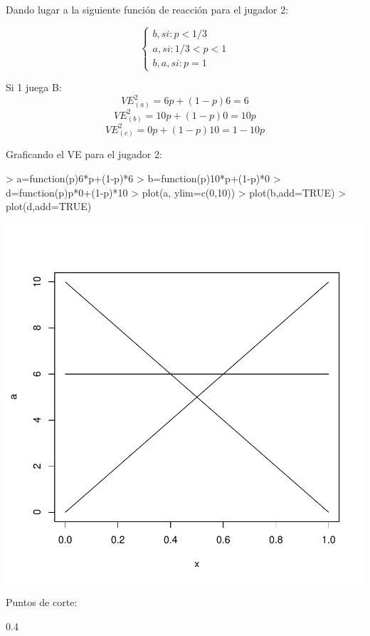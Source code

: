 \documentclass{article}
\begin{document}
Dando lugar a la siguiente funci\'on de reacci\'on para el jugador 2:

$$\left\{ \begin{array}{c} b, si: p<1/3\\ a, si: 1/3<p<1\\b,a, si: p=1\end{array}\right. $$


Si 1 juega B:
$$VE^2_{(a)}=6p+(1-p)6=6$$
$$VE^2_{(b)}=10p+(1-p)0=10p$$
$$VE^2_{(c)}=0p+(1-p)10=1-10p$$

Graficando el VE para el jugador 2:

\begin{Schunk}
\begin{Sinput}
> a=function(p){6*p+(1-p)*6}
> b=function(p){10*p+(1-p)*0}
> d=function(p){p*0+(1-p)*10}
> plot(a, ylim=c(0,10))
> plot(b,add=TRUE)
> plot(d,add=TRUE)
\end{Sinput}
\end{Schunk}
\includegraphics{PUTAPRUEBA-008}

Puntos de corte:
\begin{Schunk}
\begin{Soutput}
[1] 0.4
\end{Soutput}
\end{Schunk}
\end{document}
